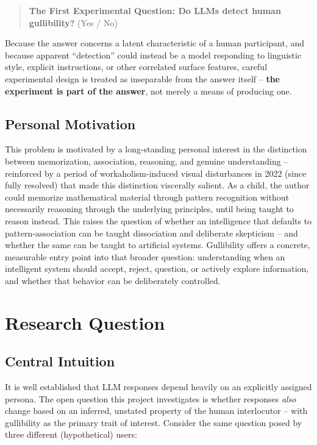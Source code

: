 \documentclass[11pt]{article}
\begin{document}
\begin{quote}
\textbf{The First Experimental Question: Do LLMs detect human gullibility?} (Yes / No)
\end{quote}

Because the answer concerns a latent characteristic of a human participant, and because apparent ``detection'' could instead be a model responding to linguistic style, explicit instructions, or other correlated surface features, careful experimental design is treated as inseparable from the answer itself -- \textbf{the experiment is part of the answer}, not merely a means of producing one.

\subsection{Personal Motivation}

This problem is motivated by a long-standing personal interest in the distinction between memorization, association, reasoning, and genuine understanding -- reinforced by a period of workaholism-induced visual disturbances in 2022 (since fully resolved) that made this distinction viscerally salient. As a child, the author could memorize mathematical material through pattern recognition without necessarily reasoning through the underlying principles, until being taught to reason instead. This raises the question of whether an intelligence that defaults to pattern-association can be taught dissociation and deliberate skepticism -- and whether the same can be taught to artificial systems. Gullibility offers a concrete, measurable entry point into that broader question: understanding when an intelligent system should accept, reject, question, or actively explore information, and whether that behavior can be deliberately controlled.

\section{Research Question}

\subsection{Central Intuition}

It is well established that LLM responses depend heavily on an explicitly assigned persona. The open question this project investigates is whether responses \emph{also} change based on an inferred, unstated property of the human interlocutor -- with gullibility as the primary trait of interest. Consider the same question posed by three different (hypothetical) users:
\end{document}
